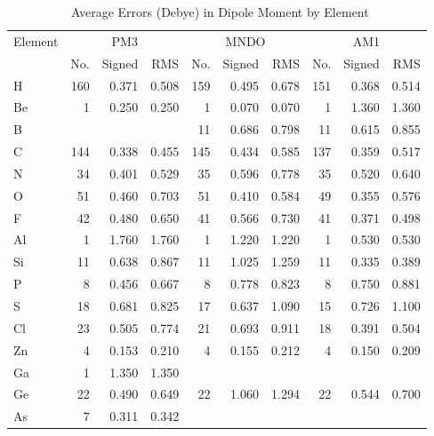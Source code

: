 \begin{table}
\caption{\label{eledip}  \  Average Errors (Debye) in Dipole Moment by Element}
\begin{center}
\begin{tabular}{lrrrrrrrrr}
Element & \multicolumn{3}{c}{PM3} & \multicolumn{3}{c}{MNDO} & \multicolumn{3}{c}{AM1} \\
 & No. & Signed &   RMS     & No. & Signed &   RMS     & No. & Signed &   RMS    \\
\hline
  H & 160 &    0.371 &    0.508 & 159 &    0.495 &    0.678 & 151 &    0.368 &    0.514 \\
 Be &   1 &    0.250 &    0.250 &   1 &    0.070 &    0.070 &   1 &    1.360 &    1.360 \\
  B &     &          &          &  11 &    0.686 &    0.798 &  11 &    0.615 &    0.855 \\
  C & 144 &    0.338 &    0.455 & 145 &    0.434 &    0.585 & 137 &    0.359 &    0.517 \\
  N &  34 &    0.401 &    0.529 &  35 &    0.596 &    0.778 &  35 &    0.520 &    0.640 \\
  O &  51 &    0.460 &    0.703 &  51 &    0.410 &    0.584 &  49 &    0.355 &    0.576 \\
  F &  42 &    0.480 &    0.650 &  41 &    0.566 &    0.730 &  41 &    0.371 &    0.498 \\
 Al &   1 &    1.760 &    1.760 &   1 &    1.220 &    1.220 &   1 &    0.530 &    0.530 \\
 Si &  11 &    0.638 &    0.867 &  11 &    1.025 &    1.259 &  11 &    0.335 &    0.389 \\
  P &   8 &    0.456 &    0.667 &   8 &    0.778 &    0.823 &   8 &    0.750 &    0.881 \\
  S &  18 &    0.681 &    0.825 &  17 &    0.637 &    1.090 &  15 &    0.726 &    1.100 \\
 Cl &  23 &    0.505 &    0.774 &  21 &    0.693 &    0.911 &  18 &    0.391 &    0.504 \\
 Zn &   4 &    0.153 &    0.210 &   4 &    0.155 &    0.212 &   4 &    0.150 &    0.209 \\
 Ga &   1 &    1.350 &    1.350 &     &          &          &     &          &          \\
 Ge &  22 &    0.490 &    0.649 &  22 &    1.060 &    1.294 &  22 &    0.544 &    0.700 \\
 As &   7 &    0.311 &    0.342 &     &          &          &     &          &          \\

\end{tabular}
\end{center}
\end{table}
